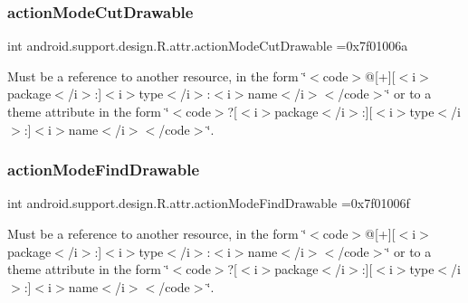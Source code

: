 \subsubsection{\texorpdfstring{action\+Mode\+Cut\+Drawable}{actionModeCutDrawable}}
{\footnotesize\ttfamily int android.\+support.\+design.\+R.\+attr.\+action\+Mode\+Cut\+Drawable =0x7f01006a\hspace{0.3cm}{\ttfamily [static]}}

Must be a reference to another resource, in the form \char`\"{}$<$code$>$@\mbox{[}+\mbox{]}\mbox{[}$<$i$>$package$<$/i$>$\+:\mbox{]}$<$i$>$type$<$/i$>$\+:$<$i$>$name$<$/i$>$$<$/code$>$\char`\"{} or to a theme attribute in the form \char`\"{}$<$code$>$?\mbox{[}$<$i$>$package$<$/i$>$\+:\mbox{]}\mbox{[}$<$i$>$type$<$/i$>$\+:\mbox{]}$<$i$>$name$<$/i$>$$<$/code$>$\char`\"{}. \mbox{\label{classandroid_1_1support_1_1design_1_1R_1_1attr_a6c300bed753442a0bfe70d18f1540cfc}} 
\subsubsection{\texorpdfstring{action\+Mode\+Find\+Drawable}{actionModeFindDrawable}}
{\footnotesize\ttfamily int android.\+support.\+design.\+R.\+attr.\+action\+Mode\+Find\+Drawable =0x7f01006f\hspace{0.3cm}{\ttfamily [static]}}

Must be a reference to another resource, in the form \char`\"{}$<$code$>$@\mbox{[}+\mbox{]}\mbox{[}$<$i$>$package$<$/i$>$\+:\mbox{]}$<$i$>$type$<$/i$>$\+:$<$i$>$name$<$/i$>$$<$/code$>$\char`\"{} or to a theme attribute in the form \char`\"{}$<$code$>$?\mbox{[}$<$i$>$package$<$/i$>$\+:\mbox{]}\mbox{[}$<$i$>$type$<$/i$>$\+:\mbox{]}$<$i$>$name$<$/i$>$$<$/code$>$\char`\"{}. \mbox{\label{classandroid_1_1support_1_1design_1_1R_1_1attr_a116ae2612632257c3b1e67f63fa9fc63}} 
